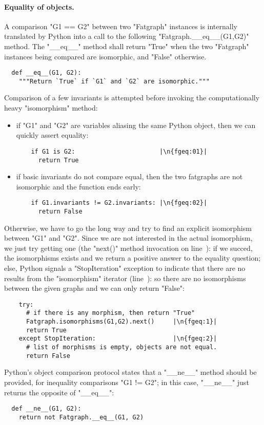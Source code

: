 \paragraph{Equality of  objects.}
A comparison "G1 == G2" between two "Fatgraph" instances is internally
translated by Python into a call to the following
"Fatgraph.__eq__(G1,G2)" method.  The "__eq__" method shall return
"True" when the two "Fatgraph" instances being compared are
isomorphic, and "False" otherwise.
\begin{lstlisting}
  def __eq__(G1, G2):
    """Return `True` if `G1` and `G2` are isomorphic."""

\end{lstlisting}
Comparison of a few invariants is attempted before invoking the
computationally heavy "isomorphism" method:
\begin{itemize}
\item if "G1" and "G2" are variables aliasing the same Python object,
  then we can quickly assert equality:
\begin{lstlisting}
    if G1 is G2:                       |\n{fgeq:01}|
      return True
\end{lstlisting}
\item if basic invariants do not compare equal, then the two fatgraphs
  are not isomorphic and the function ends early:
\begin{lstlisting}
    if G1.invariants != G2.invariants: |\n{fgeq:02}|
      return False

\end{lstlisting}
\end{itemize}
Otherwise, we have to go the long way and try to find an explicit
isomorphism between "G1" and "G2".  Since we are not interested in the
actual isomorphism, we just try getting one (the "next()" method
invocation on line~): if we succed, the isomorphisms exists
and we return a positive answer to the equality question; else, Python
signals a "StopIteration" exception to indicate that there are no
results from the "isomorphism" iterator (line~): so there
are no isomorphisms between the given graphs and we can only return
"False":
\begin{lstlisting}
    try:
      # if there is any morphism, then return "True"
      Fatgraph.isomorphisms(G1,G2).next()     |\n{fgeq:1}|
      return True
    except StopIteration:                     |\n{fgeq:2}|
      # list of morphisms is empty, objects are not equal.
      return False

\end{lstlisting}
Python's object comparison protocol states that a "__ne__" method
should be provided, for inequality comparisons "G1 != G2"; in this
case, "__ne__" just returns the opposite of "__eq__":
\begin{lstlisting}
  def __ne__(G1, G2):
    return not Fatgraph.__eq__(G1, G2)
\end{lstlisting}


